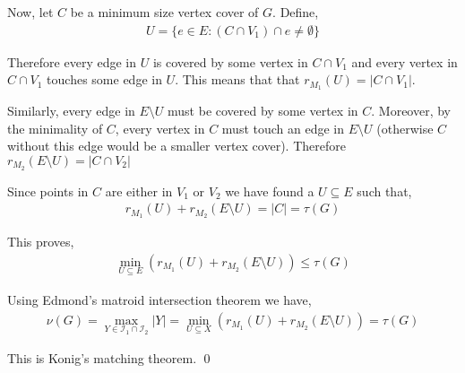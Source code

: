 \documentclass[10pt]{article}
\begin{document}
\begin{solution}
Now, let \( C \) be a minimum size vertex cover of \( G \). Define,
\begin{align*}
    U = \{ e\in E: (C\cap V_1)\cap e \neq \emptyset  \}
\end{align*}

Therefore every edge in \( U \) is covered by some vertex in \( C\cap V_1 \) and every vertex in \( C\cap V_1 \) touches some edge in \( U \). This means that that \( r_{M_1}(U) = |C\cap V_1| \).

Similarly, every edge in \( E\setminus U \) must be covered by some vertex in \( C \). Moreover, by the minimality of \( C \), every vertex in \( C \) must touch an edge in \( E\setminus U \) (otherwise \( C \) without this edge would be a smaller vertex cover). Therefore \( r_{M_2}(E\setminus U) = |C\cap V_2| \)

Since points in \( C \) are either in \( V_1 \) or \( V_2 \) we have found a \( U\subseteq E \) such that,
\begin{align*}
    r_{M_1}(U) + r_{M_2}(E\setminus U) = |C| = \tau(G)
\end{align*}

This proves,
\begin{align*}
    \min_{U\subseteq E} (r_{M_1}(U) + r_{M_2}(E\setminus U)) \leq  \tau(G)
\end{align*}



Using Edmond's matroid intersection theorem we have,
\begin{align*}
    \nu(G) 
    = \max_{Y\in \mathcal{I}_1\cap \mathcal{I}_2} |Y| 
    = \min_{U\subseteq X} (r_{M_1}(U) + r_{M_2}(E\setminus U)) 
    = \tau(G)
\end{align*}

This is Konig's matching theorem. \qed

\end{solution}
\end{document}
